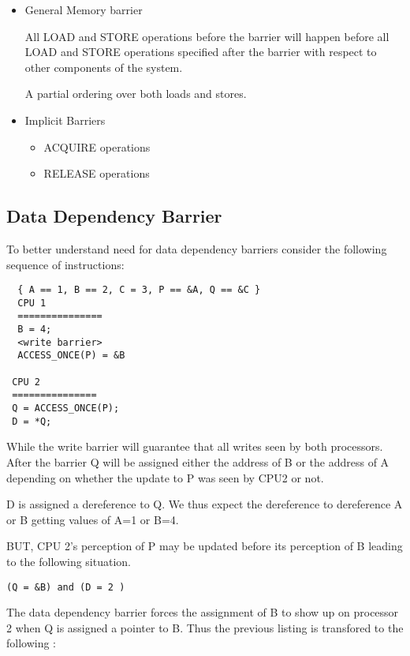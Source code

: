 \documentclass{article}
\begin{document}
\begin{itemize}
  
  
\item General Memory barrier

  All LOAD and STORE operations before the barrier will happen before
  all LOAD and STORE operations specified after the barrier with
  respect to other components of the system.

  A partial ordering over both loads and stores.  

\item Implicit Barriers
  \begin{itemize}
  \item ACQUIRE operations
  \item RELEASE operations
  \end{itemize}
\end{itemize}


\subsection{Data Dependency Barrier}

To better understand need for data dependency barriers consider 
the following sequence of instructions:

\begin{lstlisting}
  { A == 1, B == 2, C = 3, P == &A, Q == &C }
  CPU 1
  ===============
  B = 4;
  <write barrier>
  ACCESS_ONCE(P) = &B

 CPU 2
 ===============        
 Q = ACCESS_ONCE(P);
 D = *Q;
\end{lstlisting}

While the write barrier will guarantee that all writes seen by both
processors.  After the barrier Q will be assigned either the address
of B or the address of A depending on whether the update to P was seen
by CPU2 or not.

D is assigned a dereference to Q. We thus expect the dereference to
dereference A or B getting values of A=1 or B=4.

BUT, CPU 2's perception of P may be updated before its perception of B
leading to the following situation.

\begin{lstlisting}
(Q = &B) and (D = 2 ) 
\end{lstlisting}

The data dependency barrier forces the assignment of B to show up on
processor 2 when Q is assigned a pointer to B. Thus the previous
listing is transfored to the following :
\end{document}
